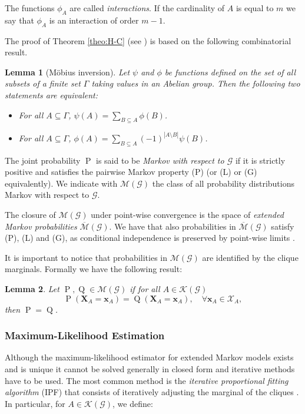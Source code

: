 \documentclass[11pt,a4paper, twoside]{book}
\newtheorem{lemma}{Lemma}[chapter]
\newcommand{\Pp}{\operatorname{P}}
\newcommand{\Pq}{\operatorname{Q}}
\newcommand{\bx}{\mathbf{x}}
\newcommand{\bX}{\mathbf{X}}
\newcommand{\bchi}{\boldsymbol{\mathcal{X}}}
\begin{document}
The functions $\phi_A$ are called \textit{interactions}. If the cardinality of $A$ is equal to $m$ we say that $\phi_A$ is an interaction of order $m-1$.

The proof of Theorem \ref{theo:H-C} (see \cite{lauritzen1996}) is based on the following combinatorial result.

\begin{lemma}[M\"{o}bius inversion]
\label{lem:mobius}
Let  $\psi$ and $\phi$ be functions defined on the set of all subsets of a finite set $\Gamma$ taking values in an Abelian group. Then the following two statements are equivalent:
\begin{itemize}
\item[(i)] For all $A\subseteq \Gamma$, $\psi(A) = \sum_{B\subseteq A} \phi(B)$.
\item[(ii)] For all $A\subseteq \Gamma$, $\phi(A) = \sum_{B \subseteq A} (-1)^{|A\setminus B|} \psi(B)$.
\end{itemize}
\end{lemma}

The joint probability $\Pp$ is said to be \textit{Markov with respect to $\mathcal{G}$} if it is strictly positive and satisfies the pairwise Markov property (P) (or (L) or (G) equivalently).
We indicate with $\mathcal{M}(\mathcal{G})$ the class of all probability distributions Markov with respect to $\mathcal{G}$.

The closure of $\mathcal{M}(\mathcal{G})$ under point-wise convergence is the space of \textit{extended Markov probabilities} $\overline{\mathcal{M}}(\mathcal{G})$. We have that also probabilities in $\overline{\mathcal{M}}(\mathcal{G})$ satisfy (P), (L) and (G), as conditional independence is preserved by point-wise limits \citep{lauritzen1996}. 

It is important to notice that probabilities in $\mathcal{M}(\mathcal{G})$ are identified by the clique marginals. Formally we have the following result:

\begin{lemma}
Let $\Pp, \Pq \in \mathcal{M}(\mathcal{G})$ if for all $A \in \mathcal{K}(\mathcal{G}) $
$$ \Pp(\bX_A=\bx_A) = \Pq(\bX_A=\bx_A), \quad \forall \bx_A \in \bchi_A , $$
then $\Pp = \Pq$.
\end{lemma}

\subsubsection{Maximum-Likelihood Estimation}
\label{sec:mlemarkov}
Although the maximum-likelihood estimator for extended Markov models exists and is unique 
it cannot be solved generally in closed form \citep{lauritzen1996} and iterative methods have to be used. The most common method is the  \textit{iterative proportional fitting algorithm} (IPF) that consists of iteratively adjusting the marginal of the cliques \citep{fienbergIPF70}. In particular, for $A \in \mathcal{K}(\mathcal{G})$, we define:
\end{document}
